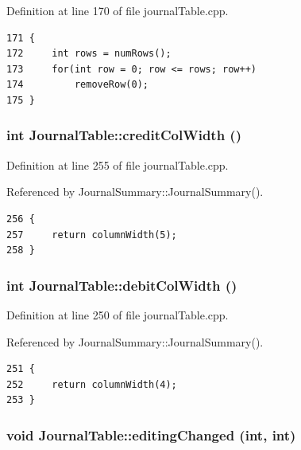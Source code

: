 Definition at line 170 of file journal\-Table.cpp.

\footnotesize\begin{verbatim}171 {
172     int rows = numRows();
173     for(int row = 0; row <= rows; row++)
174         removeRow(0);
175 }
\end{verbatim}\normalsize 


\hypertarget{classJournalTable_a4}{
\subsubsection[creditColWidth]{\setlength{\rightskip}{0pt plus 5cm}int Journal\-Table::credit\-Col\-Width ()}}
\label{classJournalTable_a4}


Definition at line 255 of file journal\-Table.cpp.

Referenced by Journal\-Summary::Journal\-Summary().

\footnotesize\begin{verbatim}256 {
257     return columnWidth(5);
258 }
\end{verbatim}\normalsize 


\hypertarget{classJournalTable_a3}{
\subsubsection[debitColWidth]{\setlength{\rightskip}{0pt plus 5cm}int Journal\-Table::debit\-Col\-Width ()}}
\label{classJournalTable_a3}


Definition at line 250 of file journal\-Table.cpp.

Referenced by Journal\-Summary::Journal\-Summary().

\footnotesize\begin{verbatim}251 {
252     return columnWidth(4);
253 }
\end{verbatim}\normalsize 


\hypertarget{classJournalTable_k1}{
\subsubsection[editingChanged]{\setlength{\rightskip}{0pt plus 5cm}void Journal\-Table::editing\-Changed (int, int)}}
\label{classJournalTable_k1}


